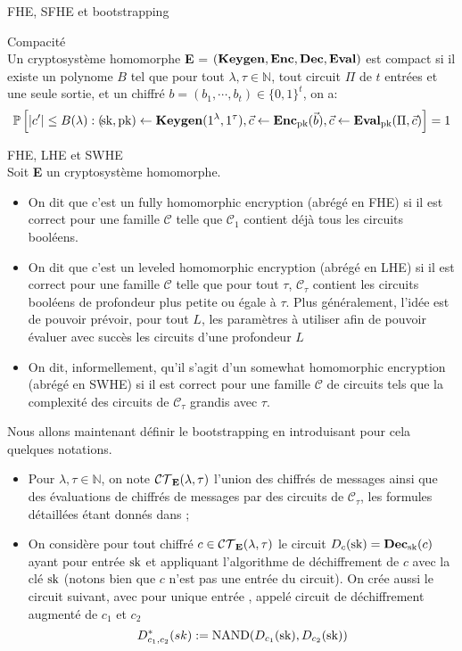 \begin{section}{FHE, SFHE et bootstrapping}
\begin{definition}{Compacité} \\
Un cryptosystème homomorphe \textbf{E} = $(\text{\textbf{Keygen}}, \text{\textbf{Enc}}, \text{\textbf{Dec}}, \text{\textbf{Eval}})$ 
est compact si il existe un polynome $B$ tel que pour tout $\lambda, \tau
\in \mathbb{N}$, tout circuit $\Pi$ de $t$ entrées et une seule sortie, et un
chiffré $b = (b_1,\cdots,b_t) \in \{0,1\}^t$, on a:
\[ 
\mathbb{P} \left[ |c'| \leq B(\lambda): (\!\text{sk},\text{pk}) \leftarrow \text{\textbf{Keygen}}(1^\lambda,
1^\tau), \vec{c} \leftarrow \text{\textbf{Enc}}_{\text{pk}}(\vec{b}), \vec{c} \leftarrow 
\text{\textbf{Eval}}_{\text{pk}}(\Pi, \vec{c}) \right] = 1
\]
\end{definition}

\begin{definition}{FHE, LHE et SWHE} \\
Soit \textbf{E} un cryptosystème homomorphe.
\begin{itemize}
\item On dit que c'est un fully homomorphic encryption (abrégé en FHE) si il est correct pour
une famille $\mathcal{C}$ telle que $\mathcal{C}_1$ contient déjà tous les
circuits booléens. 
\item On dit que c'est un  leveled homomorphic encryption (abrégé en LHE)  si il est correct pour une famille
$\mathcal{C}$ telle que pour tout $\tau$, $\mathcal{C}_\tau$ contient les circuits booléens de profondeur plus petite ou
égale à $\tau$. Plus généralement, l'idée est de pouvoir prévoir, pour tout $L$, les paramètres à utiliser afin de
pouvoir évaluer avec succès les circuits d'une profondeur $L$ 
\item On dit, informellement, qu'il s'agit d'un somewhat homomorphic encryption (abrégé en SWHE) si il est correct pour
une famille $\mathcal{C}$ de circuits tels que la complexité des circuits de $\mathcal{C}_\tau$ grandis avec $\tau$.
\end{itemize}
\end{definition}

Nous allons maintenant définir le bootstrapping en introduisant pour cela
quelques notations.

\begin{itemize}
\item Pour $\lambda, \tau \in \mathbb{N}$, on note
$\mathcal{CT}_{\text{\textbf{E}}}(\lambda,\tau)$ l'union des chiffrés de messages 
ainsi que des évaluations de chiffrés de messages par des circuits de 
$\mathcal{C}_\tau$, les formules détaillées étant donnés dans \cite{halevi};
\item On considère pour tout chiffré $c\in\mathcal{CT}_{\text{\textbf{E}}}(\lambda,\tau)$ 
le circuit $D_c(\text{sk}) = \text{\textbf{Dec}}_{\text{sk}}(c)$ ayant pour entrée $\text{sk}$ et appliquant 
l'algorithme de déchiffrement de $c$ avec la clé $\text{sk}$ (notons bien que $c$
n'est pas une entrée du circuit). On crée aussi le circuit suivant, avec pour
unique entrée \sk, appelé circuit de déchiffrement augmenté de $c_1$ et $c_2$
\[ D^*_{c_1,c_2}(sk) := \text{NAND}(D_{c_1}(\text{sk}), D_{c_2}(\text{sk}))\]
\end{itemize}


\end{section}
